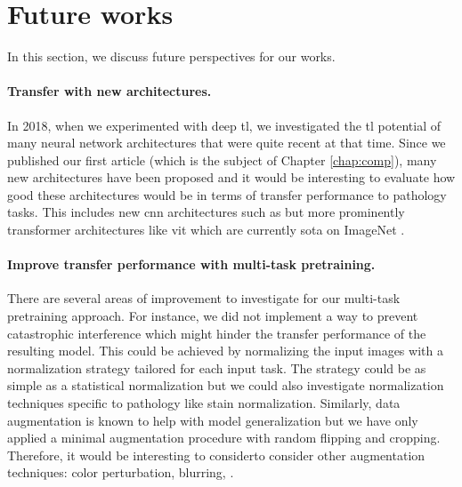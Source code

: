 
\section{Future works}
\label{sec:concl:futureworks}

In this section, we discuss future perspectives for our works.

\paragraph{Transfer with new architectures.} In 2018, when we experimented with deep \acrlong{tl}, we investigated the \acrlong{tl} potential of many neural network architectures that were quite recent at that time. Since we published our first article (which is the subject of Chapter \ref{chap:comp}), many new architectures have been proposed and it would be interesting to evaluate how good these architectures would be in terms of transfer performance to pathology tasks. This includes new \acrlong{cnn} architectures such as  but more prominently transformer architectures like \acrshort{vit} which are currently \acrlong{sota} on ImageNet .

\paragraph{Improve transfer performance with multi-task pretraining.} There are several areas of improvement to investigate for our multi-task pretraining approach. For instance, we did not implement a way to prevent catastrophic interference which might hinder the transfer performance of the resulting model. This could be achieved by normalizing the input images with a normalization strategy tailored for each input task. The strategy could be as simple as a statistical normalization but we could also investigate normalization techniques specific to pathology like stain normalization. Similarly, data augmentation is known to help with model generalization but we have only applied a minimal augmentation procedure with random flipping and cropping. Therefore, it would be interesting to considerto consider other augmentation techniques: color perturbation, blurring, \etc. 

